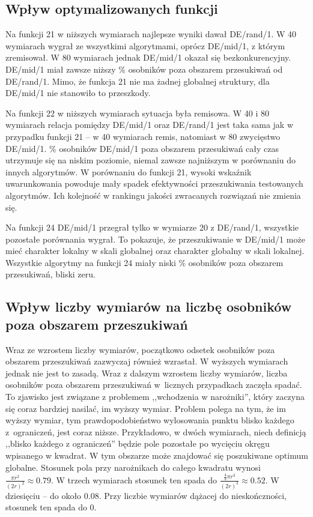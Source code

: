 \documentclass[a4paper,onecolumn,oneside,12pt,wide,floatssmall]{mwrep}
\theoremstyle{definition}
\theoremstyle{plain}%
\theoremstyle{remark}
\begin{document}
\subsection{Wpływ optymalizowanych funkcji}

Na funkcji 21 w niższych wymiarach najlepsze wyniki dawał DE/rand/1. W 40 wymiarach wygrał ze 
wszystkimi algorytmami, oprócz DE/mid/1, z którym zremisował. W 80 wymiarach jednak DE/mid/1
okazał się bezkonkurencyjny. DE/mid/1 miał zawsze niższy \% osobników poza obszarem przesukiwań
od DE/rand/1. Mimo, że funkcja 21 nie ma żadnej globalnej struktury, dla DE/mid/1 nie stanowiło to 
przeszkody.

Na funkcji 22 w niższych wymiarach sytuacja była remisowa. 
W 40 i 80 wymiarach relacja pomiędzy DE/mid/1 oraz DE/rand/1 jest taka sama jak w przypadku funkcji 21
-- w 40 wymiarach remis, natomiast w 80 zwycięstwo DE/mid/1. \% osobników DE/mid/1 poza obszarem 
przesukiwań cały czas utrzymuje się na niskim poziomie, niemal zawsze najniższym w porównaniu do 
innych algorytmów.
W porównaniu do funkcji 21, wysoki wskaźnik uwarunkowania powoduje mały spadek efektywności
przeszukiwania testowanych algorytmów. Ich kolejność w rankingu jakości zwracanych rozwiązań nie 
zmienia się.

Na funkcji 24 DE/mid/1 przegrał tylko w wymiarze 20 z DE/rand/1, wszystkie pozostałe porównania 
wygrał. To pokazuje, że przeszukiwanie w DE/mid/1 może mieć charakter lokalny w skali globalnej 
oraz charakter globalny w skali lokalnej. Wszystkie algorytmy na funkcji 24 miały niski
\% osobników poza obszarem przesukiwań, bliski zeru. 

\subsection{Wpływ liczby wymiarów na liczbę osobników poza obszarem przeszukiwań}

Wraz ze wzrostem liczby wymiarów, początkowo odsetek osobników poza obszarem przeszukiwań zazwyczaj
również wzrastał. W wyższych wymiarach jednak nie jest to zasadą. 
Wraz z dalszym wzrostem liczby wymiarów,
liczba osobników poza obszarem przeszukiwań w~licznych przypadkach zaczęła spadać.
To zjawisko jest związane z problemem ,,wchodzenia w narożniki'', który zaczyna się coraz bardziej
nasilać, im wyższy wymiar. Problem polega na tym, że im wyższy wymiar, tym prawdopodobieństwo
wylosowania punktu blisko każdego z~ograniczeń, jest coraz niższe. Przykładowo, w dwóch wymiarach,
niech definicją ,,blisko każdego z ograniczeń'' będzie pole pozostałe po wycięciu 
okręgu wpisanego w kwadrat. W tym obszarze może znajdować się poszukiwane optimum globalne.
Stosunek pola przy narożnikach do całego kwadratu wynosi $\frac{\pi r^2}{(2r)^2} \approx 0.79$.
W trzech wymiarach stosunek ten spada do $\frac{\frac{4}{3}\pi r^3}{(2r)^3} \approx 0.52$.
W dziesięciu -- do około 0.08.
Przy liczbie wymiarów dążacej do nieskończności, stosunek ten spada do 0.
\end{document}
